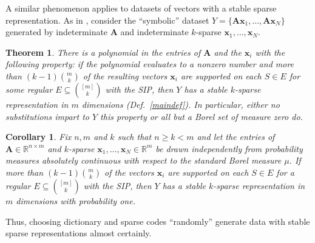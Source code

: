 \documentclass[9pt,twocolumn]{pnas-new}
\newtheorem{theorem}{Theorem}
\newtheorem{corollary}{Corollary}
\begin{document}
A similar phenomenon applies to datasets of vectors with a stable sparse representation. As in \cite[Sec.~IV]{Hillar15}, consider the ``symbolic'' dataset $Y = \{\mathbf{A}\mathbf{x}_1,\ldots,\mathbf{A} \mathbf{x}_N\}$ generated by indeterminate $\mathbf{A}$ and indeterminate $k$-sparse $\mathbf{x}_1, \ldots, \mathbf{x}_N$.  

\begin{theorem}\label{robustPolythm} %
There is a polynomial in the entries of $\mathbf{A}$ and the $\mathbf{x}_i$ with the following property:  if the polynomial evaluates to a nonzero number and more than \mbox{$(k-1){m \choose k}$} of the resulting vectors $\mathbf{x}_i$ are supported on each $S \in E$ for some regular $E \subseteq {[m] \choose k}$ with the SIP, then $Y$ has a stable $k$-sparse representation in $m$ dimensions (Def.~\ref{maindef}). In particular, either no substitutions impart to $Y$ this property or all but a Borel set of measure zero do. 
\end{theorem}


\begin{corollary}\label{ProbabilisticCor}
Fix $n, m$ and $k$ such that $n \geq k < m$ %
and let the entries of $\mathbf{A} \in \mathbb{R}^{n \times m}$ and $k$-sparse $\mathbf{x}_1, \ldots, \mathbf{x}_N \in \mathbb{R}^m$ be drawn independently from probability measures absolutely continuous with respect to the standard Borel measure $\mu$. If more than $(k-1){m \choose k}$ of the vectors $\mathbf{x}_i$ are supported on each $S \in E$ for a regular $E \subseteq {[m] \choose k}$ with the SIP, then $Y$ has a stable $k$-sparse representation in $m$ dimensions with probability one.
\end{corollary}

Thus, choosing dictionary and sparse codes ``randomly'' generate data with stable sparse representations almost certainly.


\end{document}
